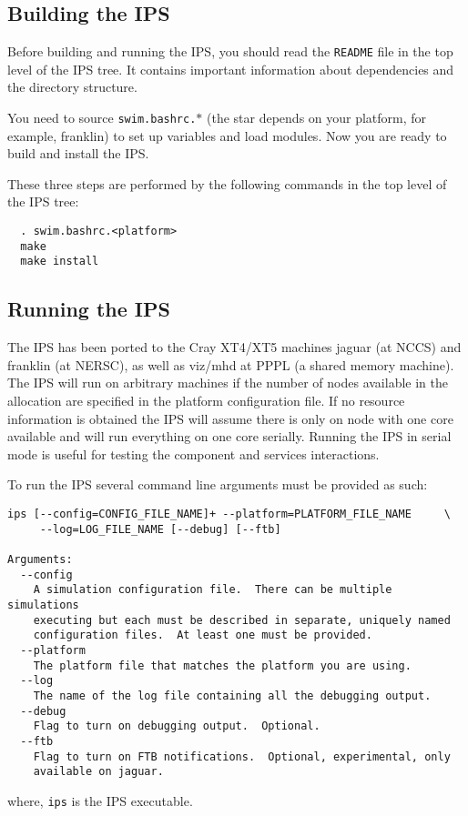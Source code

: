 \subsection{Building the IPS}
\label{sec:build}
\par
Before building and running the {IPS}, you should read the \texttt{README} file in the 
top level of the {IPS} tree.  It contains important information about 
dependencies and the directory structure.
\par
You need to source \texttt{swim.bashrc.$\ast$} (the star depends
on your platform, for example, franklin) to set
up variables and load modules.  Now you are ready to build and install the IPS.
\par
These three steps are performed by the following commands in the top level of the IPS tree:
\begin{verbatim}
  . swim.bashrc.<platform>
  make
  make install
\end{verbatim}


\subsection{Running the IPS}
\label{sec:run}
\par
The IPS has been ported to the Cray XT4/XT5 machines jaguar (at NCCS) and franklin (at NERSC), as well as viz/mhd at PPPL (a shared memory machine).  The IPS will run on arbitrary machines if the number of nodes available in the allocation are specified in the platform configuration file.  If no resource information is obtained  the IPS will assume there is only on node with one core available and will run everything on one core serially.  Running the IPS in serial mode is useful for testing the component and services interactions.

\par
To run the IPS several command line arguments must be provided as such:
\begin{verbatim}
ips [--config=CONFIG_FILE_NAME]+ --platform=PLATFORM_FILE_NAME     \
     --log=LOG_FILE_NAME [--debug] [--ftb]
  
Arguments:
  --config
    A simulation configuration file.  There can be multiple simulations 
    executing but each must be described in separate, uniquely named
    configuration files.  At least one must be provided.
  --platform
    The platform file that matches the platform you are using.
  --log
    The name of the log file containing all the debugging output.
  --debug
    Flag to turn on debugging output.  Optional.
  --ftb
    Flag to turn on FTB notifications.  Optional, experimental, only 
    available on jaguar.

\end{verbatim}
where, \texttt{ips} is the IPS executable.

